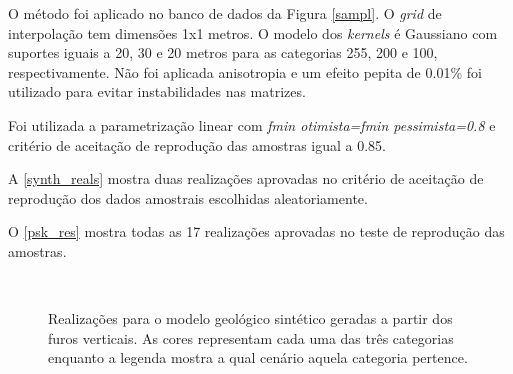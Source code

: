 O método foi aplicado no banco de dados da Figura \autoref{sampl}. O \textit{grid} de interpolação tem dimensões 1x1 metros. O modelo dos \textit{kernels} é Gaussiano com suportes iguais a 20, 30 e 20 metros para as categorias 255, 200 e 100, respectivamente. Não foi aplicada anisotropia e um efeito pepita de 0.01\% foi utilizado para evitar instabilidades nas matrizes.

Foi utilizada a parametrização linear com \textit{fmin otimista=fmin pessimista=0.8} e critério de aceitação de reprodução das amostras igual a 0.85.

A \autoref{synth_reals} mostra duas realizações aprovadas no critério de aceitação de reprodução dos dados amostrais escolhidas aleatoriamente.

O \autoref{psk_res} mostra todas as 17 realizações aprovadas no teste de reprodução das amostras.

\begin{figure}[H]
    \centering
    \caption{Realizações para o modelo geológico sintético geradas a partir dos furos verticais. As cores representam cada uma das três categorias enquanto a legenda mostra a qual cenário aquela categoria pertence.} \label{synth_reals}
     \\
\end{figure}

